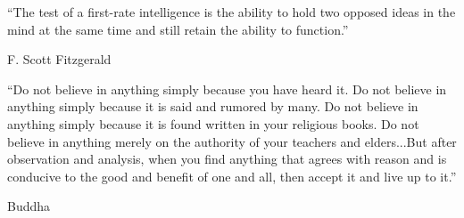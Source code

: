 \documentclass[11pt,letterpaper]{article}
\begin{document}
\epigraph{
  ``The test of a first-rate intelligence is the ability to hold two opposed ideas in the mind at the same time and still retain the ability to function.''
}{F. Scott Fitzgerald}

\epigraph{
  ``Do not believe in anything simply because you have heard it. Do not believe in anything simply because it is said and rumored by many. Do not believe in anything simply because it is found written in your religious books. Do not believe in anything merely on the authority of your teachers and elders...But after observation and analysis, when you find anything that agrees with reason and is conducive to the good and benefit of one and all, then accept it and live up to it.''
}{Buddha}
\end{document}
